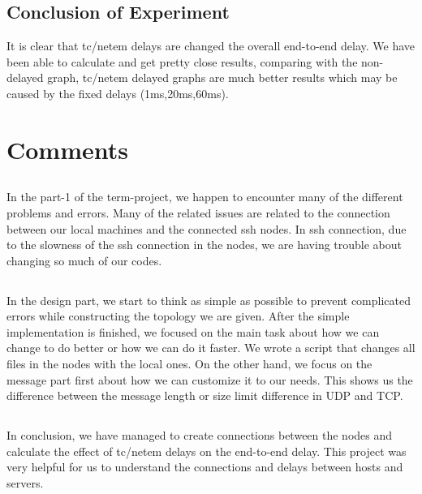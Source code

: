 \documentclass[conference]{IEEEtran}
\begin{document}
\subsection{Conclusion of Experiment}
It is clear that tc/netem delays are changed the overall end-to-end delay. We have been able to calculate and get pretty close results, comparing with the non-delayed graph, tc/netem delayed graphs are much better results which may be caused by the fixed delays (1ms,20ms,60ms). 

\section*{Comments}

\subsection*{}
In the part-1 of the term-project, we happen to encounter many of the different problems and errors. Many of the related issues are related to the connection between our local machines and the connected ssh nodes. In ssh connection, due to the slowness of the ssh connection in the nodes, we are having trouble about changing so much of our codes. 

\subsection*{}
In the design part, we start to think as simple as possible to prevent complicated errors while constructing the topology we are given. After the simple implementation is finished, we focused on the main task about how we can change to do better or how we can do it faster. We wrote a script that changes all files in the nodes with the local ones. On the other hand, we focus on the message part first about how we can customize it to our needs. This shows us the difference between the message length or size limit difference in UDP and TCP. 

\subsection*{}
In conclusion, we have managed to create connections between the nodes and calculate the effect of tc/netem delays on the end-to-end delay. This project was very helpful for us to understand the connections and delays between hosts and servers.
\end{document}
